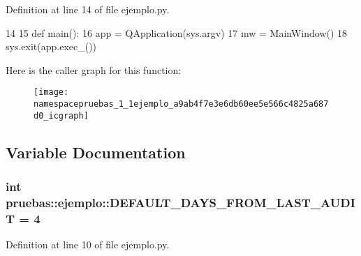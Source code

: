 \-Definition at line 14 of file ejemplo.\-py.


\begin{DoxyCode}
14 
15 def main():
16     app = QApplication(sys.argv)
17     mw = MainWindow()
18     sys.exit(app.exec_())

\end{DoxyCode}


\-Here is the caller graph for this function\-:\nopagebreak
\begin{figure}[H]
\begin{center}
\leavevmode
\texttt{[image: namespacepruebas\_1\_1ejemplo\_a9ab4f7e3e6db60ee5e566c4825a687d0\_icgraph]}
\end{center}
\end{figure}




\subsection{\-Variable \-Documentation}
\subsubsection[{\-D\-E\-F\-A\-U\-L\-T\-\_\-\-D\-A\-Y\-S\-\_\-\-F\-R\-O\-M\-\_\-\-L\-A\-S\-T\-\_\-\-A\-U\-D\-I\-T}]{\setlength{\rightskip}{0pt plus 5cm}int {\bf pruebas\-::ejemplo\-::\-D\-E\-F\-A\-U\-L\-T\-\_\-\-D\-A\-Y\-S\-\_\-\-F\-R\-O\-M\-\_\-\-L\-A\-S\-T\-\_\-\-A\-U\-D\-I\-T} = 4}\label{namespacepruebas_1_1ejemplo_a8f463d2e773a2ad27a397a316fa88ffe}


\-Definition at line 10 of file ejemplo.\-py.

